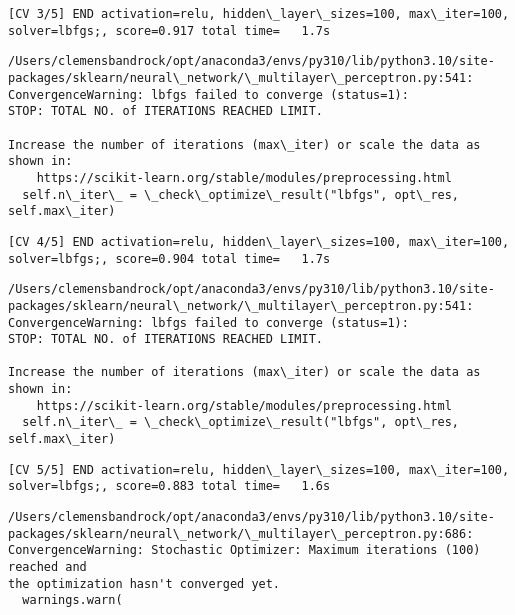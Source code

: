 \documentclass[11pt]{article}
\begin{document}
    \begin{Verbatim}[commandchars=\\\{\}]
[CV 3/5] END activation=relu, hidden\_layer\_sizes=100, max\_iter=100,
solver=lbfgs;, score=0.917 total time=   1.7s
    \end{Verbatim}

    \begin{Verbatim}[commandchars=\\\{\}]
/Users/clemensbandrock/opt/anaconda3/envs/py310/lib/python3.10/site-
packages/sklearn/neural\_network/\_multilayer\_perceptron.py:541:
ConvergenceWarning: lbfgs failed to converge (status=1):
STOP: TOTAL NO. of ITERATIONS REACHED LIMIT.

Increase the number of iterations (max\_iter) or scale the data as shown in:
    https://scikit-learn.org/stable/modules/preprocessing.html
  self.n\_iter\_ = \_check\_optimize\_result("lbfgs", opt\_res, self.max\_iter)
    \end{Verbatim}

    \begin{Verbatim}[commandchars=\\\{\}]
[CV 4/5] END activation=relu, hidden\_layer\_sizes=100, max\_iter=100,
solver=lbfgs;, score=0.904 total time=   1.7s
    \end{Verbatim}

    \begin{Verbatim}[commandchars=\\\{\}]
/Users/clemensbandrock/opt/anaconda3/envs/py310/lib/python3.10/site-
packages/sklearn/neural\_network/\_multilayer\_perceptron.py:541:
ConvergenceWarning: lbfgs failed to converge (status=1):
STOP: TOTAL NO. of ITERATIONS REACHED LIMIT.

Increase the number of iterations (max\_iter) or scale the data as shown in:
    https://scikit-learn.org/stable/modules/preprocessing.html
  self.n\_iter\_ = \_check\_optimize\_result("lbfgs", opt\_res, self.max\_iter)
    \end{Verbatim}

    \begin{Verbatim}[commandchars=\\\{\}]
[CV 5/5] END activation=relu, hidden\_layer\_sizes=100, max\_iter=100,
solver=lbfgs;, score=0.883 total time=   1.6s
    \end{Verbatim}

    \begin{Verbatim}[commandchars=\\\{\}]
/Users/clemensbandrock/opt/anaconda3/envs/py310/lib/python3.10/site-
packages/sklearn/neural\_network/\_multilayer\_perceptron.py:686:
ConvergenceWarning: Stochastic Optimizer: Maximum iterations (100) reached and
the optimization hasn't converged yet.
  warnings.warn(
    \end{Verbatim}
\end{document}
